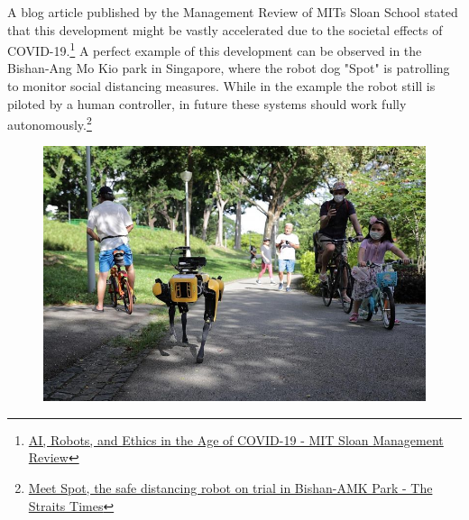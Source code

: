 A blog article published by the Management Review of MITs Sloan School stated that this development might be vastly accelerated due to the societal effects of COVID-19.\footnote{\href{https://sloanreview.mit.edu/article/ai-robots-and-ethics-in-the-age-of-covid-19/}{AI, Robots, and Ethics in the Age of COVID-19 - MIT Sloan Management Review}} A perfect example of this development can be observed in the Bishan-Ang Mo Kio park in Singapore, where the robot dog "Spot" is patrolling to monitor social distancing measures. While in the example the robot still is piloted by a human controller, in future these systems should work fully autonomously.\footnote{\href{http://www.straitstimes.com/singapore/meet-spot-the-safe-distancing-robot-on-trial-in-bishan-amk-park}{Meet Spot, the safe distancing robot on trial in Bishan-AMK Park - The Straits Times}}

\begin{figure}[!ht]
\begin{center}
\includegraphics[width=\imgwidth]{images/spot.jpg}
\label{img:spot_in_park}
\end{center}
\end{figure}


